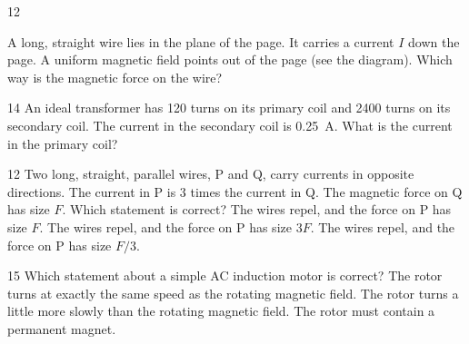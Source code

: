 \begin{practiceq}{1}{2}\label{pq:wiredir}
\begin{sidebyside}[0.30]
  \centering
\nextside
A long, straight wire lies in the plane of the page. It carries a current $I$ down the page.
A uniform magnetic field points out of the page (see the diagram). Which way is the magnetic
force on the wire?
\end{sidebyside}
\end{practiceq}

\begin{practiceq}{1}{4}\label{pq:current}
An ideal transformer has 120 turns on its primary coil and 2400 turns on its secondary coil.
The current in the secondary coil is \qty{0.25}{A}. What is the current in the primary
coil?
\end{practiceq}

\begin{practiceq}{1}{2}\label{pq:newton3}
Two long, straight, parallel wires, P and Q, carry currents in opposite directions. The
current in P is 3 times the current in Q. The magnetic force on Q has size $F$. Which
statement is correct?
  {The wires repel, and the force on P has size $F$.}
  {The wires repel, and the force on P has size $3F$.}
  {The wires repel, and the force on P has size $F/3$.}
\end{practiceq}

\begin{practiceq}{1}{5}\label{pq:induction}
Which statement about a simple AC induction motor is correct?
  {The rotor turns at exactly the same speed as the rotating magnetic field.}
  {The rotor turns a little more slowly than the rotating magnetic field.}
  {The rotor must contain a permanent magnet.}
\end{practiceq}

